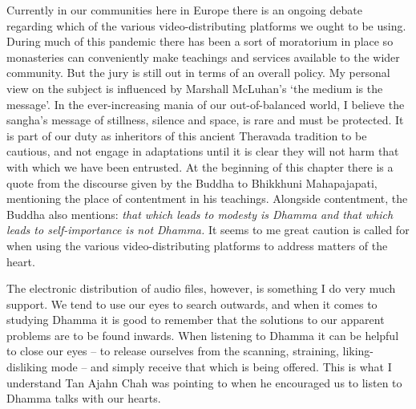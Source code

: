 Currently in our communities here in Europe there is an ongoing debate
regarding which of the various video-distributing platforms we ought to
be using. During much of this pandemic there has been a sort of
moratorium in place so monasteries can conveniently make teachings and
services available to the wider community. But the jury is still out in
terms of an overall policy. My personal view on the subject is
influenced by Marshall McLuhan's `the medium is the message'. In the
ever-increasing mania of our out-of-balanced world, I believe the
sangha's message of stillness, silence and space, is rare and must be
protected. It is part of our duty as inheritors of this ancient
Theravada tradition to be cautious, and not engage in adaptations until
it is clear they will not harm that with which we have been entrusted.
At the beginning of this chapter there is a quote from the discourse
given by the Buddha to Bhikkhuni Mahapajapati, mentioning the place of
contentment in his teachings. Alongside contentment, the Buddha also
mentions: \emph{that which leads to modesty is Dhamma and that which
leads to self-importance is not Dhamma.} It seems to me great caution is
called for when using the various video-distributing platforms to
address matters of the heart.

The electronic distribution of audio files, however, is something I do
very much support. We tend to use our eyes to search outwards, and when
it comes to studying Dhamma it is good to remember that the solutions to
our apparent problems are to be found inwards. When listening to Dhamma
it can be helpful to close our eyes -- to release ourselves from the
scanning, straining, liking-disliking mode -- and simply receive that
which is being offered. This is what I understand Tan Ajahn Chah was
pointing to when he encouraged us to listen to Dhamma talks with our
hearts.

